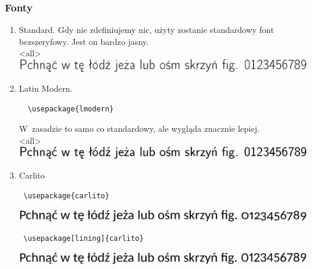 \documentclass[12pt,aspectratio=169,ignorenonframetext]{beamer}
\begin{document}
\begin{frame}
 \frametitle<presentation>{Fonty}
 \hypertarget{fonty}{\null}
 \begin{enumerate}
  \item Standard.
        Gdy nie zdefiniujemy nic, użyty zostanie standardowy font bezszeryfowy. Jest on bardzo jasny.\\<all>
        \includegraphics[width=.8\textwidth]{default}
  \item Latin Modern.
        \begin{lstlisting}
  \usepackage{lmodern}
  \end{lstlisting}
        W~zasadzie to samo co standardowy, ale wygląda znacznie lepiej.\\<all>
        \includegraphics[width=.8\textwidth]{lmodern}
  \item Carlito 
        \begin{lstlisting}
 \usepackage{carlito}
\end{lstlisting}
        \includegraphics[width=.8\textwidth]{carlito}
        \begin{lstlisting}
 \usepackage[lining]{carlito}
\end{lstlisting}
        \includegraphics[width=.8\textwidth]{carlito_lining}


\end{enumerate}
\end{frame}
\end{document}
